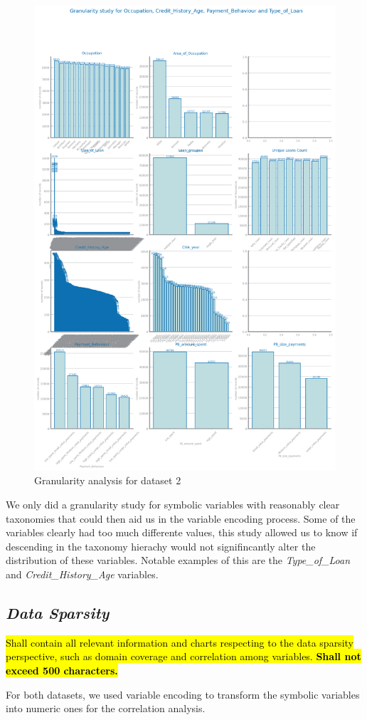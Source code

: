 \documentclass[10pt]{extarticle}
\newcommand{\ctext}[3][RGB]{%
  \begingroup
  \definecolor{hlcolor}{#1}{#2}\sethlcolor{hlcolor}%
  \hl{#3}%
  \endgroup
}
\begin{document}
\begin{figure}[H]
\centering\includegraphics[scale=0.5]{images/dataset2/data_profiling/Credit_Score_granularity.png}
\caption{Granularity analysis for dataset 2}
\end{figure}
We only did a granularity study for symbolic variables with reasonably clear taxonomies that could then aid us in the variable
encoding process. Some of the variables clearly had too much differente values, this study allowed us to know if descending in the
taxonomy hierachy would not signifincantly alter the distribution of these variables. Notable examples of this are the 
\textit{Type\_of\_Loan} and \textit{Credit\_History\_Age} variables.

\subsection*{\textit{Data Sparsity}}
\ctext[RGB]{190,190,190}{Shall contain all relevant information and charts respecting to the data sparsity perspective, such as domain coverage and correlation among variables.  \textbf{Shall not exceed 500 characters.}}
For both datasets, we used variable encoding to transform the symbolic variables into numeric ones for the correlation analysis.
\end{document}
